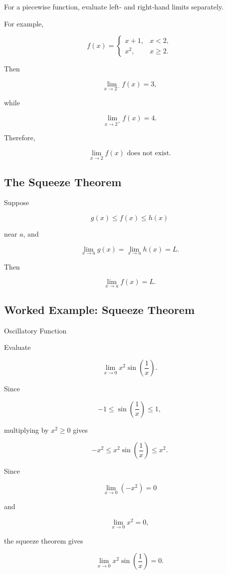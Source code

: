For a piecewise function, evaluate left- and right-hand limits separately.

For example,

\[
f(x)
=
\begin{cases}
x+1, & x<2,\\
x^2, & x\geq2.
\end{cases}
\]

Then

\[
\lim_{x\to2^-}f(x)=3,
\]

while

\[
\lim_{x\to2^+}f(x)=4.
\]

Therefore,

\[
\boxed{
\lim_{x\to2}f(x)
\text{ does not exist}.
}
\]

\subsection{The Squeeze Theorem}
\label{subsec:squeeze-theorem-reference}

Suppose

\[
g(x)
\leq
f(x)
\leq
h(x)
\]

near \(a\), and

\[
\lim_{x\to a}g(x)
=
\lim_{x\to a}h(x)
=
L.
\]

Then

\[
\boxed{
\lim_{x\to a}f(x)
=
L.
}
\]

\subsection{Worked Example: Squeeze Theorem}
\label{subsec:worked-squeeze-theorem}

\begin{workedexamplebox}{Oscillatory Function}

Evaluate

\[
\lim_{x\to0}
x^2\sin\left(\frac1x\right).
\]

Since

\[
-1
\leq
\sin\left(\frac1x\right)
\leq
1,
\]

multiplying by \(x^2\geq0\) gives

\[
-x^2
\leq
x^2\sin\left(\frac1x\right)
\leq
x^2.
\]

Since

\[
\lim_{x\to0}(-x^2)=0
\]

and

\[
\lim_{x\to0}x^2=0,
\]

the squeeze theorem gives

\begin{answerbox}
\[
\boxed{
\lim_{x\to0}
x^2\sin\left(\frac1x\right)
=
0.
}
\]
\end{answerbox}

\end{workedexamplebox}

